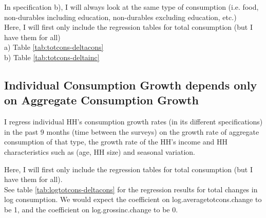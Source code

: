 \documentclass[12pt,a4paper]{article}
\begin{document}
In specification b), I will always look at the same type of consumption (i.e. food, non-durables including education, non-durables excluding education, etc.) \\

Here, I will first only include the regression tables for total consumption (but I have them for all) \\

a) Table \ref{tab:totcons-deltacons}  \\
% 
% 
% 
% 


b) Table \ref{tab:totcons-deltainc}

% 
% 
% 
% 

\subsection*{Individual Consumption Growth depends only on Aggregate Consumption Growth}

I regress individual HH's consumption growth rates (in its different specifications) in the past 9 months (time between the surveys) on the growth rate of aggregate consumption of that type, the growth rate of the HH's income and HH characteristics such as (age, HH size) and seasonal variation. 

Here, I will first only include the regression tables for total consumption (but I have them for all). \\

See table  \ref{tab:logtotcons-deltacons} for the regression results for total changes in log consumption. We would expect the coefficient on log.averagetotcons.change to be 1, and the coefficient on log.grossinc.change to be 0. \\


%  
% 
% 
% 
\end{document}
